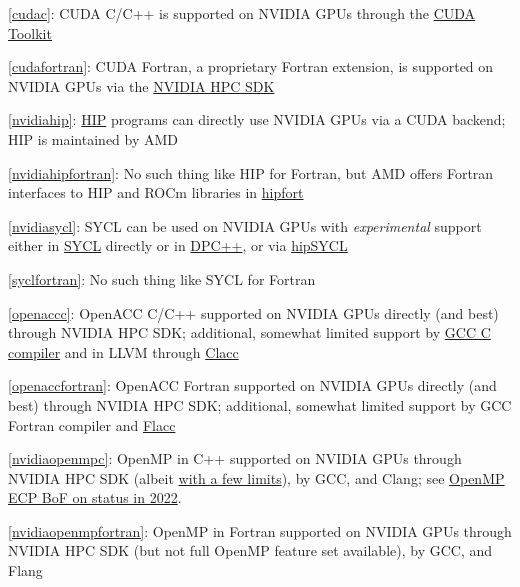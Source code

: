 \item \ref{cudac}: CUDA C/C++ is supported on NVIDIA GPUs through the \href{https://developer.nvidia.com/cuda-toolkit}{CUDA Toolkit}
\item \ref{cudafortran}: CUDA Fortran, a proprietary Fortran extension, is supported on NVIDIA GPUs via the \href{https://developer.nvidia.com/hpc-sdk}{NVIDIA HPC SDK}
\item \ref{nvidiahip}: \href{https://github.com/ROCm-Developer-Tools/HIP}{HIP} programs can directly use NVIDIA GPUs via a CUDA backend; HIP is maintained by AMD
\item \ref{nvidiahipfortran}: No such thing like HIP for Fortran, but AMD offers Fortran interfaces to HIP and ROCm libraries in \href{https://github.com/ROCmSoftwarePlatform/hipfort}{hipfort}
\item \ref{nvidiasycl}: SYCL can be used on NVIDIA GPUs with \emph{experimental} support either in \href{https://github.com/codeplaysoftware/sycl-for-cuda/blob/cuda/sycl/doc/GetStartedWithSYCLCompiler.md\#build-sycl-toolchain-with-support-for-nvidia-cuda}{SYCL} directly or in \href{https://github.com/intel/llvm/blob/sycl/sycl/doc/GetStartedGuide.md\#build-dpc-toolchain-with-support-for-nvidia-cuda}{DPC++}, or via \href{https://github.com/illuhad/hipSYCL}{hipSYCL}
\item \ref{syclfortran}: No such thing like SYCL for Fortran
\item \ref{openaccc}: OpenACC C/C++ supported on NVIDIA GPUs directly (and best) through NVIDIA HPC SDK; additional, somewhat limited support by \href{https://gcc.gnu.org/wiki/OpenACC}{GCC C compiler} and in LLVM through \href{https://csmd.ornl.gov/project/clacc}{Clacc}
\item \ref{openaccfortran}: OpenACC Fortran supported on NVIDIA GPUs directly (and best) through NVIDIA HPC SDK; additional, somewhat limited support by GCC Fortran compiler and \href{https://ieeexplore.ieee.org/document/9651310}{Flacc}
\item \ref{nvidiaopenmpc}: OpenMP in C++ supported on NVIDIA GPUs through NVIDIA HPC SDK (albeit \href{https://docs.nvidia.com/hpc-sdk/compilers/hpc-compilers-user-guide/index.html\#openmp-use}{with a few limits}), by GCC, and Clang; see \href{https://www.openmp.org/wp-content/uploads/2022_ECP_Community_BoF_Days-OpenMP_RoadMap_BoF.pdf}{OpenMP ECP BoF on status in 2022}.
\item \ref{nvidiaopenmpfortran}: OpenMP in Fortran supported on NVIDIA GPUs through NVIDIA HPC SDK (but not full OpenMP feature set available), by GCC, and Flang

